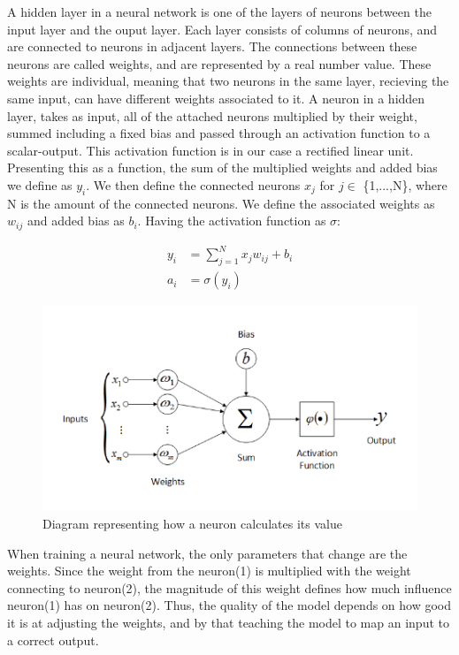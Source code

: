 A hidden layer in a neural network is one of the layers of neurons between the input layer and the ouput layer. Each layer consists of columns of neurons, and are connected to neurons in adjacent layers. The connections between these neurons are called weights, and are represented by a real number value. These weights are individual, meaning that two neurons in the same layer, recieving the same input, can have different weights associated to it. A neuron in a hidden layer, takes as input, all of the attached neurons multiplied by their weight, summed including a fixed bias and passed through an activation function to a scalar-output. This activation function is in our case a rectified linear unit.\\

\noindent
Presenting this as a function, the sum of the multiplied weights and added bias we define as $y_i$. We then define the connected neurons $x_j$ for $j \in$ \{1,...,N\}, where N is the amount of the connected neurons. We define the associated weights as $w_{ij}$ and added bias as $b_i$. Having the activation function as $\sigma$:

\begin{align}
  y_i &= \sum^N_{j=1} x_jw_{ij} + b_i\\
  a_i &= \sigma(y_i)
\end{align}


\begin{figure}[!ht]
  \centering
  \includegraphics[scale=1.0]{latex/imgs/neuronFunc.png}
  \caption{Diagram representing how a neuron calculates its value}\label{Baseline:before}
\end{figure}

\noindent
When training a neural network, the only parameters that change are the weights. Since the weight from the neuron(1) is multiplied with the weight connecting to neuron(2), the magnitude of this weight defines how much influence neuron(1) has on neuron(2). Thus, the quality of the model depends on how good it is at adjusting the weights, and by that teaching the model to map an input to a correct output.
